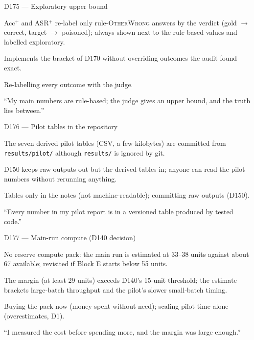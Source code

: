\documentclass[11pt,a4paper]{report}
\begin{document}
\begin{decisionbox}{D175 --- Exploratory upper bound}
\begin{description}[nosep, leftmargin=0pt]
  \item[Decision.] Acc$^{+}$ and ASR$^{+}$ re-label only rule-\textsc{OtherWrong} answers by the verdict (gold $\to$ correct, target $\to$ poisoned); always shown next to the rule-based values and labelled exploratory.
  \item[Why.] Implements the bracket of D170 without overriding outcomes the audit found exact.
  \item[Alternatives.] Re-labelling every outcome with the judge.
  \item[Interview line.] ``My main numbers are rule-based; the judge gives an upper bound, and the truth lies between.''
\end{description}
\end{decisionbox}

\begin{decisionbox}{D176 --- Pilot tables in the repository}
\begin{description}[nosep, leftmargin=0pt]
  \item[Decision.] The seven derived pilot tables (CSV, a few kilobytes) are committed from \texttt{results/pilot/} although \texttt{results/} is ignored by git.
  \item[Why.] D150 keeps raw outputs out but the derived tables in; anyone can read the pilot numbers without rerunning anything.
  \item[Alternatives.] Tables only in the notes (not machine-readable); committing raw outputs (D150).
  \item[Interview line.] ``Every number in my pilot report is in a versioned table produced by tested code.''
\end{description}
\end{decisionbox}

\begin{decisionbox}{D177 --- Main-run compute (D140 decision)}
\begin{description}[nosep, leftmargin=0pt]
  \item[Decision.] No reserve compute pack: the main run is estimated at 33--38 units against about 67 available; revisited if Block E starts below 55 units.
  \item[Why.] The margin (at least 29 units) exceeds D140's 15-unit threshold; the estimate brackets large-batch throughput and the pilot's slower small-batch timing.
  \item[Alternatives.] Buying the pack now (money spent without need); scaling pilot time alone (overestimates, D1).
  \item[Interview line.] ``I measured the cost before spending more, and the margin was large enough.''
\end{description}
\end{decisionbox}
\end{document}
